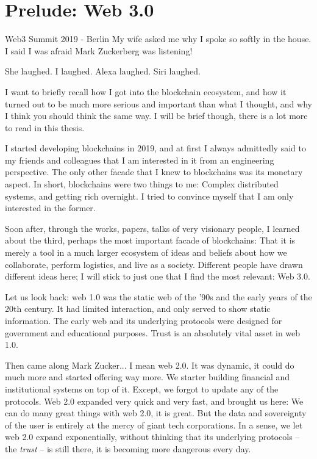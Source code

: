 \chapter*{Prelude: Web 3.0}

\begin{chapquote}{Web3 Summit 2019 - Berlin}
	My wife asked me why I spoke so softly in the house. I said I was afraid Mark Zuckerberg was
	listening!

	She laughed. I laughed. Alexa laughed. Siri laughed.
\end{chapquote}

I want to briefly recall how I got into the blockchain ecosystem, and how it turned out to be much
more serious and important than what I thought, and why I think you should think the same way. I
will be brief though, there is a lot more to read in this thesis.

I started developing blockchains in 2019, and at first I always admittedly said to my friends and
colleagues that I am interested in it from an engineering perspective. The only other facade that I
knew to blockchains was its monetary aspect. In short, blockchains were two things to me: Complex
distributed systems, and getting rich overnight. I tried to convince myself that I am only
interested in the former.

Soon after, through the works, papers, talks of very visionary people, I learned about the third,
perhaps the most important facade of blockchains: That it is merely a tool in a much larger
ecosystem of ideas and beliefs about how we collaborate, perform logistics, and live as a society.
Different people have drawn different ideas here; I will stick to just one that I find the most
relevant: Web 3.0.

Let us look back: web 1.0 was the static web of the '90s and the early years of the 20th century. It
had limited interaction, and only served to show static information. The early web and its
underlying protocols were designed for government and educational purposes. Trust is an absolutely
vital asset in web 1.0.

Then came along Mark Zucker... I mean web 2.0. It was dynamic, it could do much more and started
offering way more. We starter building financial and institutional systems on top of it. Except, we
forgot to update any of the protocols. Web 2.0 expanded very quick and very fast, and brought us
here: We can do many great things with web 2.0, it is great. But the data and sovereignty of the
user is entirely at the mercy of giant tech corporations. In a sense, we let web 2.0 expand
exponentially, without thinking that its underlying protocols -- the \textit{trust} -- is still
there, it is becoming more dangerous every day.


